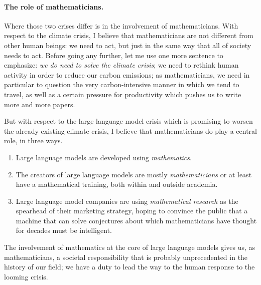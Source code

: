 \documentclass[a4paper,12pt]{article}
\begin{document}
	\paragraph{The role of mathematicians.}
	Where those two crises differ is in the involvement of mathematicians.
	With respect to the climate crisis, I believe that mathematicians are not different from other human beings: we need to act, but just in the same way that all of society needs to act.
	Before going any further, let me use one more sentence to emphasize: \emph{we do need to solve the climate crisis}; we need to rethink human activity in order to reduce our carbon emissions; as mathematicians, we need in particular to question the very carbon-intensive manner in which we tend to travel, as well as a certain pressure for productivity which pushes us to write more and more papers.
	
	But with respect to the large language model crisis which is promising to worsen the already existing climate crisis, I believe that mathematicians do play a central role, in three ways.
	\begin{enumerate}
		\item Large language models are developed using \emph{mathematics}.
		\item The creators of large language models are mostly \emph{mathematicians} or at least have a mathematical training, both within and outside academia.
		\item Large language model companies are using \emph{mathematical research} as the spearhead of their marketing strategy, hoping to convince the public that a machine that can solve conjectures about which mathematicians have thought for decades must be intelligent.
	\end{enumerate}
	The involvement of mathematics at the core of large language models gives us, as mathematicians, a societal responsibility that is probably unprecedented in the history of our field; we have a duty to lead the way to the human response to the looming crisis.
	
\end{document}
